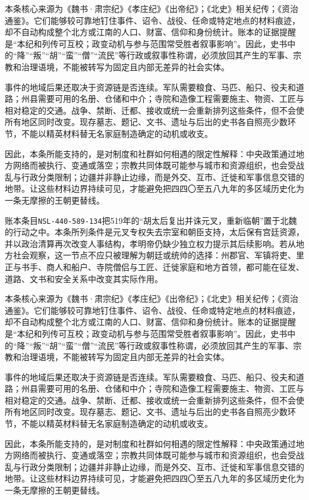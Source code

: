 本条核心来源为《魏书·肃宗纪》《孝庄纪》《出帝纪》；《北史》相关纪传；《资治通鉴》。它们能够较可靠地钉住事件、诏令、战役、任命或特定地点的材料痕迹，却不自动构成整个北方或江南的人口、财富、信仰和身份统计。账本的证据提醒是“本纪和列传可互校；政变动机与参与范围常受胜者叙事影响”。因此，史书中的“降”“叛”“胡”“蛮”“僧”“流民”等行政或叙事性称谓，必须放回其产生的军事、宗教和治理语境，不能被转写为固定且内部无差异的社会实体。

事件的地域后果还取决于资源链是否连续。军队需要粮食、马匹、船只、役夫和道路；州县需要可用的名册、仓储和中介；寺院和造像工程需要施主、物资、工匠与相对稳定的交通。战争、禁断、迁都、接收或统一会重新排列这些条件，但不会使所有地区同时改变。现存墓志、题记、文书、遗址与后出的史书各自照亮少数环节，不能以精英材料替无名家庭制造确定的动机或收支。

因此，本条所能支持的，是对制度和社群如何相遇的限定性解释：中央政策通过地方网络而被执行、变通或落空；宗教共同体既可能参与城市和资源组织，也会受战乱与行政分类限制；边疆并非静止边缘，而是外交、互市、迁徙和军事信息交错的地带。让这些材料边界持续可见，才能避免把四四〇至五八九年的多区域历史化为一条无摩擦的王朝更替线。

账本条目\texttt{NSL-440-589-134}把519年的“胡太后复出并诛元叉，重新临朝”置于北魏的行动之中。本条所列条件是元叉专权失去宗室和朝臣支持，太后保有宫廷资源，并以政治清算再次改变人事结构，孝明帝仍缺少独立权力提示其后续影响。若从地方社会观察，这一节点不应只被理解为朝廷或统帅的选择：州郡官、军镇将吏、里正与书手、商人和船户、寺院僧侣与工匠、迁徙家庭和地方首领，都可能在征发、道路、文书和安全关系中改变其实际作用。

本条核心来源为《魏书·肃宗纪》《孝庄纪》《出帝纪》；《北史》相关纪传；《资治通鉴》。它们能够较可靠地钉住事件、诏令、战役、任命或特定地点的材料痕迹，却不自动构成整个北方或江南的人口、财富、信仰和身份统计。账本的证据提醒是“本纪和列传可互校；政变动机与参与范围常受胜者叙事影响”。因此，史书中的“降”“叛”“胡”“蛮”“僧”“流民”等行政或叙事性称谓，必须放回其产生的军事、宗教和治理语境，不能被转写为固定且内部无差异的社会实体。

事件的地域后果还取决于资源链是否连续。军队需要粮食、马匹、船只、役夫和道路；州县需要可用的名册、仓储和中介；寺院和造像工程需要施主、物资、工匠与相对稳定的交通。战争、禁断、迁都、接收或统一会重新排列这些条件，但不会使所有地区同时改变。现存墓志、题记、文书、遗址与后出的史书各自照亮少数环节，不能以精英材料替无名家庭制造确定的动机或收支。

因此，本条所能支持的，是对制度和社群如何相遇的限定性解释：中央政策通过地方网络而被执行、变通或落空；宗教共同体既可能参与城市和资源组织，也会受战乱与行政分类限制；边疆并非静止边缘，而是外交、互市、迁徙和军事信息交错的地带。让这些材料边界持续可见，才能避免把四四〇至五八九年的多区域历史化为一条无摩擦的王朝更替线。

